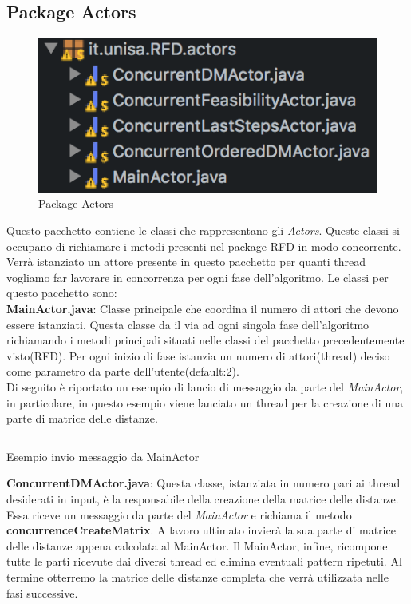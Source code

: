 \subsection{Package Actors}
\begin{figure}[H]
	\centering
	\includegraphics{Immagini/PackageActors.png}
	\caption{Package Actors}
	\label{fig:Package Actors}
\end{figure}
Questo pacchetto contiene le classi che rappresentano gli \emph{Actors}.
Queste classi si occupano di richiamare i metodi presenti nel package RFD in modo concorrente.
Verrà istanziato un attore presente in questo pacchetto per quanti thread vogliamo far lavorare in concorrenza per ogni fase dell'algoritmo.
Le classi per questo pacchetto sono:\\
\textbf{MainActor.java}:
Classe principale che coordina il numero di attori che devono essere istanziati.
Questa classe da il via ad ogni singola fase dell'algoritmo richiamando i metodi principali situati nelle classi del pacchetto precedentemente visto(RFD).
Per ogni inizio di fase istanzia un numero di attori(thread) deciso come parametro da parte dell'utente(default:2).\\
Di seguito è riportato un esempio di lancio di messaggio da parte del \emph{MainActor}, in particolare, in questo esempio viene lanciato un thread per la creazione di una parte di matrice delle distanze.\\
\begin{listing}[H]
	\inputminted[]{java}{Codici/CreateMatrixMessage.java}
	\caption{Esempio invio messaggio da MainActor}
	\label{Code:8}
\end{listing}
\textbf{ConcurrentDMActor.java}:
Questa classe, istanziata in numero pari ai thread desiderati in input, è la responsabile della creazione della matrice delle distanze. Essa riceve un messaggio da parte del \emph{MainActor} e richiama il metodo \textbf{concurrenceCreateMatrix}.
A lavoro ultimato invierà la sua parte di matrice delle distanze appena calcolata al MainActor. Il MainActor, infine, ricompone tutte le parti ricevute dai diversi thread ed elimina eventuali pattern ripetuti. Al termine otterremo la matrice delle distanze completa che verrà utilizzata nelle fasi successive.
